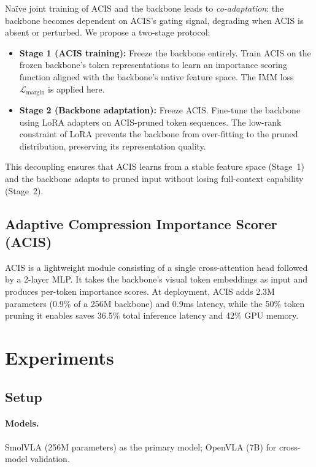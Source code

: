 \documentclass[10pt,twocolumn]{article}
\begin{document}
Na\"ive joint training of ACIS and the backbone leads to \emph{co-adaptation}: the backbone becomes dependent on ACIS's gating signal, degrading when ACIS is absent or perturbed.
We propose a two-stage protocol:

\begin{itemize}
    \item \textbf{Stage 1 (ACIS training):} Freeze the backbone entirely. Train ACIS on the frozen backbone's token representations to learn an importance scoring function aligned with the backbone's native feature space. The IMM loss $\mathcal{L}_{\text{margin}}$ is applied here.
    \item \textbf{Stage 2 (Backbone adaptation):} Freeze ACIS. Fine-tune the backbone using LoRA adapters on ACIS-pruned token sequences. The low-rank constraint of LoRA prevents the backbone from over-fitting to the pruned distribution, preserving its representation quality.
\end{itemize}

This decoupling ensures that ACIS learns from a stable feature space (Stage~1) and the backbone adapts to pruned input without losing full-context capability (Stage~2).

\subsection{Adaptive Compression Importance Scorer (ACIS)}

ACIS is a lightweight module consisting of a single cross-attention head followed by a 2-layer MLP. It takes the backbone's visual token embeddings as input and produces per-token importance scores. At deployment, ACIS adds 2.3M parameters (0.9\% of a 256M backbone) and 0.9ms latency, while the 50\% token pruning it enables saves 36.5\% total inference latency and 42\% GPU memory.

\section{Experiments}
\label{sec:experiments}

\subsection{Setup}

\paragraph{Models.} SmolVLA (256M parameters) as the primary model; OpenVLA (7B) for cross-model validation.
\end{document}
